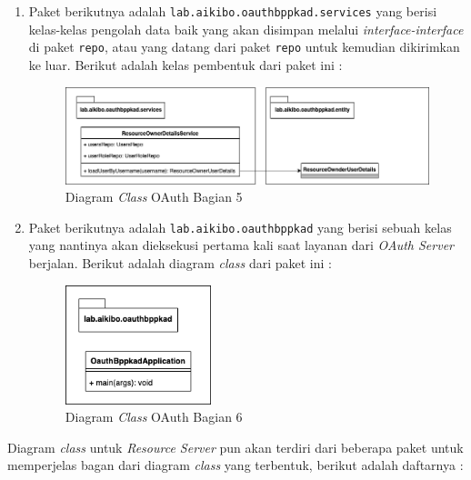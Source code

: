 \documentclass[pdftex,12pt, oneside]{article}
\begin{document}
\begin{enumerate}
	\item Paket berikutnya adalah \texttt{lab.aikibo.oauthbppkad.services} yang berisi kelas-kelas pengolah data baik yang akan disimpan melalui \textit{interface-interface} di paket \texttt{repo}, atau yang datang dari paket \texttt{repo} untuk kemudian dikirimkan ke luar. Berikut adalah kelas pembentuk dari paket ini :

\begin{figure}[H]
	\centering
	\includegraphics[width=1\textwidth]{./resources/class-dia-oauth-4}
	\caption{Diagram \textit{Class} OAuth Bagian 5}
	\label{fig:class-dia-oauth-4}
\end{figure}

	\item Paket berikutnya adalah \texttt{lab.aikibo.oauthbppkad} yang berisi sebuah kelas yang nantinya akan dieksekusi pertama kali saat layanan dari \textit{OAuth Server} berjalan. Berikut adalah diagram \textit{class} dari paket ini :

\begin{figure}[H]
	\centering
	\includegraphics[width=0.4\textwidth]{./resources/class-dia-oauth-5}
	\caption{Diagram \textit{Class} OAuth Bagian 6}
	\label{fig:class-dia-oauth-5}
\end{figure}

\end{enumerate}

Diagram \textit{class} untuk \textit{Resource Server} pun akan terdiri dari beberapa paket untuk memperjelas bagan dari diagram \textit{class} yang terbentuk, berikut adalah daftarnya :
\end{document}
